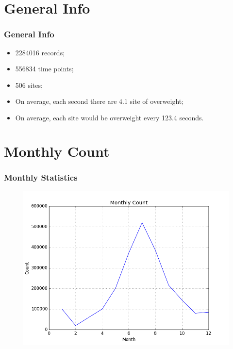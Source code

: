 

\section{General Info}
\begin{frame}
\frametitle{General Info}
\begin{itemize}
\item 2284016 records;
\item 556834 time points;
\item 506 sites;
\item On average, each second there are 4.1 site of overweight;
\item On average, each site would be overweight every 123.4 seconds.
\end{itemize}
\end{frame}

\section{Monthly Count}
\begin{frame}
\frametitle{Monthly Statistics}
\begin{figure}
\includegraphics[width=\textwidth]{img/Month.png}
\end{figure}
\end{frame}


